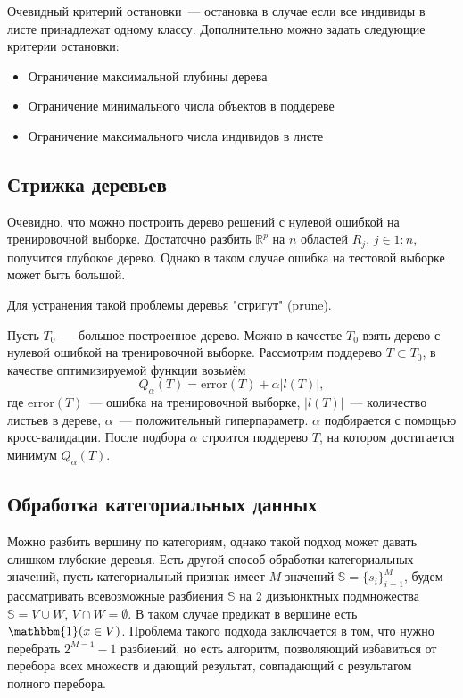 \documentclass{article}
\theoremstyle{definition}
\theoremstyle{theorem}
\theoremstyle{remark}
\theoremstyle{theorem}
\theoremstyle{example}
\theoremstyle{theorem}
\theoremstyle{theorem}
\theoremstyle{theorem}
\theoremstyle{theorem}
\begin{document}
Очевидный критерий остановки~--- остановка в случае если все индивиды в листе принадлежат одному классу. Дополнительно можно задать следующие критерии остановки:
	\begin{itemize}
		\item Ограничение максимальной глубины дерева
		\item Ограничение минимального числа объектов в поддереве

		\item Ограничение максимального числа индивидов в листе
	\end{itemize}
	\subsection{Стрижка деревьев}
	
	Очевидно, что можно построить дерево решений с нулевой ошибкой на тренировочной выборке. Достаточно разбить $\mathbb R^p$ на $n$ областей $R_j$, $j\in1:n$, получится глубокое дерево. Однако в таком случае ошибка на тестовой выборке может быть большой.
	
	Для устранения такой проблемы деревья "стригут" (prune). 
	
	Пусть $T_0$~--- большое построенное дерево. Можно в качестве $T_0$ взять дерево с нулевой ошибкой на тренировочной выборке. Рассмотрим поддерево $T\subset T_0$, в качестве оптимизируемой функции возьмём $$Q_\alpha(T)=\mathrm{error}(T)+\alpha|l(T)|,$$ где $\mathrm{error}(T)$~--- ошибка на тренировочной выборке, $|l(T)|$~--- количество листьев в дереве, $\alpha$~--- положительный гиперпараметр. $\alpha$ подбирается с помощью кросс-валидации. После подбора $\alpha$ строится поддерево $T$, на котором достигается минимум $Q_\alpha(T)$. 
	\subsection{Обработка категориальных данных}
		Можно разбить вершину по категориям, однако такой подход может давать слишком глубокие деревья. Есть другой способ обработки категориальных значений, пусть категориальный признак имеет $M$ значений $\mathbb S=\{s_i\}_{i=1}^M$, будем рассматривать всевозможные разбиения $\mathbb S$ на 2 дизъюнктных подмножества $\mathbb S=V\cup W$, $V\cap W=\emptyset$. В таком случае предикат в вершине есть $\mathbbm{1}(x\in V)$. Проблема такого подхода заключается в том, что нужно перебрать $2^{M-1}-1$ разбиений, но есть алгоритм, позволяющий избавиться от перебора всех множеств и дающий результат, совпадающий с результатом полного перебора.
	
\end{document}
